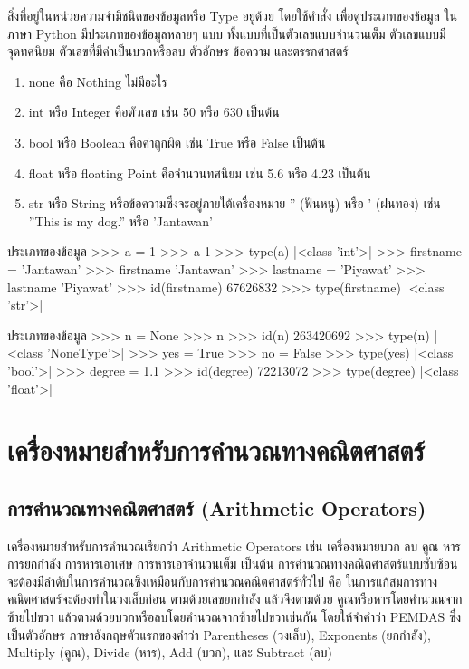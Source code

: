 สิ่งที่อยู่ในหน่วยความจำมีชนิดของข้อมูลหรือ Type อยู่ด้วย โดยใช้คำสั่ง  เพื่อดูประเภทของข้อมูล ในภาษา Python มีประเภทของข้อมูลหลายๆ แบบ \cite{Luc15} ทั้งแบบที่เป็นตัวเลขแบบจำนวนเต็ม ตัวเลขแบบมีจุดทศนิยม ตัวเลขที่มีค่าเป็นบวกหรือลบ ตัวอักษร ข้อความ และตรรกศาสตร์

\begin{enumerate}[noitemsep]
\item none คือ Nothing ไม่มีอะไร 
\item int หรือ Integer คือตัวเลข เช่น 50 หรือ 630 เป็นต้น
\item bool หรือ Boolean คือค่าถูกผิด เช่น True หรือ False เป็นต้น
\item float หรือ floating Point คือจำนวนทศนิยม เช่น 5.6 หรือ 4.23 เป็นต้น
\item str หรือ String หรือข้อความซึ่งจะอยู่ภายใต้เครื่องหมาย '' (ฟันหนู) หรือ ' (ฝนทอง) เช่น ''This is my dog.''  หรือ 'Jantawan'
\end{enumerate}

\begin{codelist}{ประเภทของข้อมูล}{}
>>> a = 1
>>> a
1
>>> type(a)
|<class \rq{}int\rq{}>|
>>> firstname = 'Jantawan'
>>> firstname
'Jantawan'
>>> lastname = 'Piyawat'
>>> lastname
'Piyawat'
>>> id(firstname)
67626832
>>> type(firstname)
|<class \rq{}str\rq{}>|
\end{codelist}


\begin{codelist}{ประเภทของข้อมูล}{}
>>> n = None
>>> n
>>> id(n)
263420692
>>> type(n)
|<class \rq{}NoneType\rq{}>|
>>> yes = True
>>> no = False
>>> type(yes)
|<class \rq{}bool\rq{}>|
>>> degree = 1.1
>>> id(degree)
72213072
>>> type(degree)
|<class \rq{}float\rq{}>|
\end{codelist}


\section{เครื่องหมายสำหรับการคำนวณทางคณิตศาสตร์}
\subsection{การคำนวณทางคณิตศาสตร์ (Arithmetic Operators)}

เครื่องหมายสำหรับการคำนวณเรียกว่า  Arithmetic Operators เช่น เครื่องหมายบวก ลบ คูณ หาร การยกกำลัง การหารเอาเศษ การหารเอาจำนวนเต็ม เป็นต้น การคำนวณทางคณิตศาสตร์แบบซับซ้อนจะต้องมีลำดับในการคำนวณซึ่งเหมือนกับการคำนวณคณิตศาสตร์ทั่วไป คือ ในการแก้สมการทางคณิตศาสตร์จะต้องทำในวงเล็บก่อน ตามด้วยเลขยกกำลัง แล้วจึงตามด้วย คูณหรือหารโดยคำนวณจากซ้ายไปขวา แล้วตามด้วยบวกหรือลบโดยคำนวณจากซ้ายไปขวาเช่นกัน โดยให้จำคำว่า PEMDAS ซึ่งเป็นตัวอักษร ภาษาอังกฤษตัวแรกของคำว่า Parentheses (วงเล็บ), Exponents (ยกกำลัง), Multiply (คูณ), Divide (หาร), Add (บวก), และ Subtract (ลบ) 

